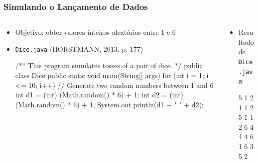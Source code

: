 \documentclass[xcolor={dvipsnames,table},aspectratio=169]{beamer}
\begin{document}
\begin{frame}[fragile]\frametitle{Simulando o Lançamento de Dados}
\begin{columns}[T]
	\begin{column}{0.7\linewidth}
\begin{itemize}
	\item Objetivo: obter valores inteiros aleatórios entre 1 e 6
	\item \texttt{Dice.java} (HORSTMANN, 2013, p. 177)
{\scriptsize
\begin{javacode}
/** This program simulates tosses of a pair of dice. */
public class Dice {
   public static void main(String[] args) {
      for (int i = 1; i <= 10; i++) {
         // Generate two random numbers between 1 and 6
         int d1 = (int) (Math.random() * 6) + 1;
         int d2 = (int) (Math.random() * 6) + 1;
         System.out.println(d1 + " " + d2);
      }
   }
}
\end{javacode}
}
\end{itemize}
	\end{column}
	\begin{column}{0.3\linewidth}
\begin{itemize}
	\item Resultado de \texttt{Dice.java}:
{\scriptsize
\begin{javacode}
5 1
2 1
1 2
5 1
1 2
6 4
4 4
6 1
6 3
5 2
\end{javacode}
}
\end{itemize}
	\end{column}
\end{columns}
\end{frame}
\end{document}
